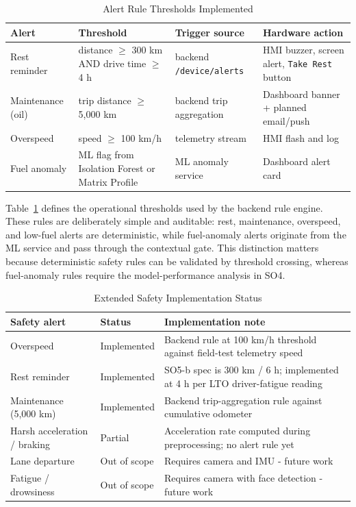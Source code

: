 \begin{table}[!htbp]
\centering
\caption{Alert Rule Thresholds Implemented}
\label{tab:alert_rule_thresholds}
\scriptsize
\setlength{\tabcolsep}{2pt}
\renewcommand{\arraystretch}{1.15}
\begin{tabular}{|p{}|p{}|p{}|p{}|}
\hline
\textbf{Alert} & \textbf{Threshold} & \textbf{Trigger source} & \textbf{Hardware action} \\
\hline
Rest reminder & distance $\geq$ 300 km AND drive time $\geq$ 4 h & backend \texttt{/device/alerts} & HMI buzzer, screen alert, \texttt{Take Rest} button \\
\hline
Maintenance (oil) & trip distance $\geq$ 5,000 km & backend trip aggregation & Dashboard banner + planned email/push \\
\hline
Overspeed & speed $\geq$ 100 km/h & telemetry stream & HMI flash and log \\
\hline
Fuel anomaly & ML flag from Isolation Forest or Matrix Profile & ML anomaly service & Dashboard alert card \\
\hline
\end{tabular}
\normalsize
\end{table}

Table~\ref{tab:alert_rule_thresholds} defines the operational thresholds used by the backend rule engine. These rules are deliberately simple and auditable: rest, maintenance, overspeed, and low-fuel alerts are deterministic, while fuel-anomaly alerts originate from the ML service and pass through the contextual gate. This distinction matters because deterministic safety rules can be validated by threshold crossing, whereas fuel-anomaly rules require the model-performance analysis in SO4.

\begin{table}[!htbp]
\centering
\caption{Extended Safety Implementation Status}
\label{tab:extended_safety_status}
\scriptsize
\begin{tabular}{|p{}|p{}|p{}|}
\hline
\textbf{Safety alert} & \textbf{Status} & \textbf{Implementation note} \\
\hline
Overspeed & Implemented & Backend rule at 100 km/h threshold against field-test telemetry speed \\
\hline
Rest reminder & Implemented & SO5-b spec is 300 km / 6 h; implemented at 4 h per LTO driver-fatigue reading \\
\hline
Maintenance (5,000 km) & Implemented & Backend trip-aggregation rule against cumulative odometer \\
\hline
Harsh acceleration / braking & Partial & Acceleration rate computed during preprocessing; no alert rule yet \\
\hline
Lane departure & Out of scope & Requires camera and IMU - future work \\
\hline
Fatigue / drowsiness & Out of scope & Requires camera with face detection - future work \\
\hline
\end{tabular}
\normalsize
\end{table}

